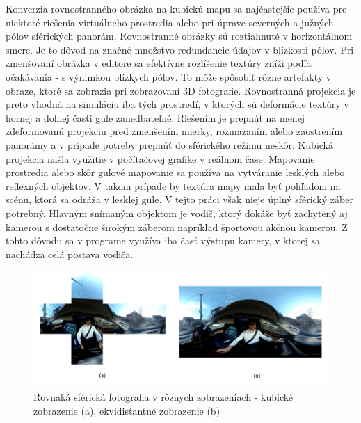 \documentclass[slovak,master,dept460,male,cpp,cpdeclaration]{diploma}
\begin{document}
Konverzia rovnostranného obrázka na kubickú mapu sa najčastejšie používa pre niektoré riešenia virtuálneho prostredia alebo pri úprave severných a južných pólov sférických panorám.
Rovnostranné obrázky sú roztiahnuté v horizontálnom smere. Je to dôvod na značné množstvo redundancie údajov v blízkosti pólov. Pri zmenšovaní obrázka v editore sa efektívne rozlíšenie textúry zníži podľa očakávania - s výnimkou blízkych pólov. To môže spôsobiť rôzne artefakty v obraze, ktoré sa zobrazia pri zobrazovaní 3D fotografie. Rovnostranná projekcia je preto vhodná na simuláciu iba tých prostredí, v ktorých sú deformácie textúry v hornej a dolnej časti gule zanedbateľné. Riešením je prepnúť na menej zdeformovanú projekciu pred zmenšením mierky, rozmazaním alebo zaostrením panorámy a v prípade potreby prepnúť do sférického režimu neskôr. Kubická projekcia našla využitie v počítačovej grafike v reálnom čase. Mapovanie prostredia alebo skôr guľové mapovanie sa používa na vytváranie lesklých alebo reflexných objektov. V takom prípade by textúra mapy mala byť pohľadom na scénu, ktorá sa odráža v lesklej gule. V tejto práci však nieje  úplný sférický záber potrebný. Hlavným snímaným objektom je vodič, ktorý dokáže byť zachytený aj kamerou s dostatočne širokým záberom napríklad športovou akčnou kamerou. Z tohto dôvodu sa v programe využíva iba časť výstupu kamery, v ktorej sa nachádza celá postava vodiča.

\begin{figure}[H]
	\centering
	\includegraphics[width=1\textwidth]{Figures/cubemapVsEcti.png}
	\caption{Rovnaká sférická fotografia v rôznych zobrazeniach  - kubické zobrazenie (a), ekvidistantné zobrazenie (b)}
	\label{fig:sphereFormats}
\end{figure}




\newpage
\end{document}
